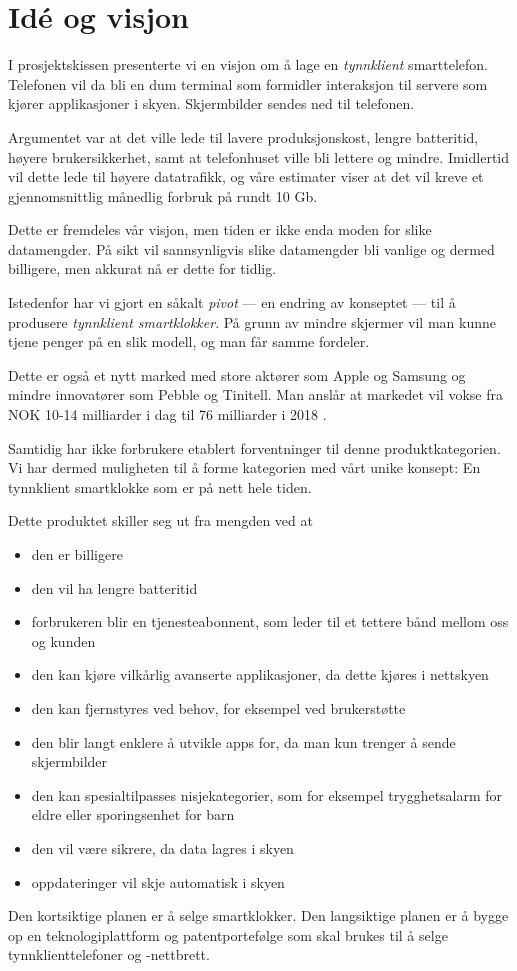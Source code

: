 \section{Idé og visjon}

I prosjektskissen presenterte vi en visjon om å lage en \textit{tynnklient}
smarttelefon. Telefonen vil da bli en dum terminal som formidler interaksjon
til servere som kjører applikasjoner i skyen. Skjermbilder sendes ned til
telefonen.

Argumentet var at det ville lede til lavere produksjonskost, lengre
batteritid, høyere brukersikkerhet, samt at telefonhuset ville bli lettere og
mindre.  Imidlertid vil dette lede til høyere datatrafikk, og våre estimater
viser at det vil kreve et gjennomsnittlig månedlig forbruk på rundt 10 Gb.

Dette er fremdeles vår visjon, men tiden er ikke enda moden for slike
datamengder. På sikt vil sannsynligvis slike datamengder bli vanlige og dermed
billigere, men akkurat nå er dette for tidlig.

Istedenfor har vi gjort en såkalt \textit{pivot} --- en endring av
konseptet --- til å produsere \textit{tynnklient smartklokker}.  På grunn av
mindre skjermer vil man kunne tjene penger på en slik modell, og man får samme
fordeler.

Dette er også et nytt marked med store aktører som Apple og Samsung
og mindre innovatører som Pebble og Tinitell. Man anslår at markedet vil vokse
fra NOK 10-14 milliarder i dag til 76 milliarder i 2018 \cite{citi.grow}.

Samtidig har ikke forbrukere etablert forventninger til denne
produktkategorien. Vi har dermed muligheten til å forme kategorien med vårt
unike konsept: En tynnklient smartklokke som er på nett hele tiden.

Dette produktet skiller seg ut fra mengden ved at

\begin{itemize}
  \item den er billigere
  \item den vil ha lengre batteritid
  \item forbrukeren blir en tjenesteabonnent, som leder til et tettere bånd
  mellom oss og kunden
  \item den kan kjøre vilkårlig avanserte applikasjoner, da dette kjøres i
  nettskyen
  \item den kan fjernstyres ved behov, for eksempel ved brukerstøtte
  \item den blir langt enklere å utvikle apps for, da man kun trenger å sende
  skjermbilder
  \item den kan spesialtilpasses nisjekategorier, som for eksempel
  trygghetsalarm for eldre eller sporingsenhet for barn
  \item den vil være sikrere, da data lagres i skyen
  \item oppdateringer vil skje automatisk i skyen
\end{itemize}

Den kortsiktige planen er å selge smartklokker. Den langsiktige planen er å
bygge op en teknologiplattform og patentportefølge som skal brukes til å selge
tynnklienttelefoner og -nettbrett.
